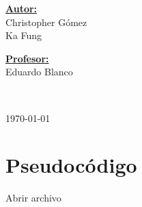 \documentclass[11pt]{article}
\begin{document}
\begin{center}
   \begin{minipage}{\textwidth} 
      \begin{flushleft} \large    
         \textbf{\underline{Autor:}} \\ 
         Christopher Gómez \\
         Ka Fung \\
      \end{flushleft}
   \end{minipage}

   \begin{minipage}{\textwidth}    
      \vspace{-0.6cm}  
      \begin{flushright} \large    
         \textbf{\underline{Profesor:}} \\  
         Eduardo Blanco  
      \end{flushright}        
   \end{minipage} 

   \vspace*{1cm}
   \\
   \vspace{2cm}  

   \begin{center} 
      {\large \today} 
   \end{center}     
\end{center}                                                      
                                                               
\newpage
                                                    

\section{Pseudocódigo}

\begin{codebox}
   \li Abrir archivo
   \End
   \end{codebox}
\end{document}
